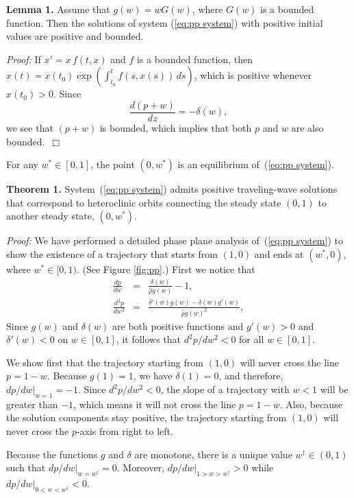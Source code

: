 \documentclass{aims}
\numberwithin{equation}{section}
\begin{document}
\noindent
\textbf{Lemma 1.} Assume that $g(w)=wG(w)$, where $G(w)$ is a bounded function. 
Then the solutions of system (\ref{eq:pp system}) with positive initial values are positive and bounded.

\noindent
\emph{Proof:} If $x'=x\,f(t, x)$ and $f$ is a bounded function, then 
$x(t)=x(t_0)\exp \left(\int^t_{t_0} f(s, x(s))\, ds\right)$, which is positive whenever
$x(t_0)>0$. Since
\begin{equation}
\frac{d(p+w)}{dz}=-\delta(w),
\end{equation}
we see that $(p+w)$ is bounded, which implies that both $p$ and $w$ are also bounded.~$\Box$

For any $w^*\in [0,1]$, the point $(0, w^*)$ is an equilibrium of~(\ref{eq:pp system}).

\noindent
\textbf{Theorem 1.}  System~(\ref{eq:pp system}) admits positive traveling-wave solutions
that correspond to heteroclinic orbits connecting the steady state $(0, 1)$ to another
steady state, $(0, w^*)$.

\indent
\emph{Proof:} We have performed a detailed phase plane analysis of~(\ref{eq:pp system})
to show the existence of a trajectory that starts from $(1,0)$ and ends at $(w^{*},0)$,
where $w^*\in [0,1)$.  (See Figure \ref{fig:pp}.)
First we notice that 
\begin{eqnarray}
\frac{dp}{dw} & = & \frac{\delta(w)}{\hat{\rho}g(w)}-1 , \\
\frac{d^2 p}{dw^{2}} & = & \frac{\delta'(w)g(w)-\delta(w)g'(w)}{\hat{\rho} g(w)^{2}},
\end{eqnarray}
Since $g(w)$ and $\delta(w)$ are both positive functions and
$g'(w)>0$ and $\delta'(w)<0$ on $w\in [0,1]$, it follows that
$d^{2}p/dw^{2}<0$ for all $w\in [0,1]$. 

We show first that the trajectory starting from $(1,0)$ will never cross the line $p=1-w$.
Because $g(1)=1$, we have $\delta(1)=0$, and therefore, $dp/dw\big\vert_{w=1}=-1$.
Since $d^2 p/dw^{2}<0$, the slope of a trajectory with $w<1$ will be greater than
$-1$, which means it will not cross the line $p=1-w$.
Also, because the solution components stay positive, the trajectory starting
from $(1,0)$ will never cross the $p$-axis from right to left. 

Because the functions $g$ and $\delta$ are monotone, 
there is a unique value $w^{\dagger}\in (0, 1)$ such that 
$dp/dw\big\vert_{w=w^{\dagger}}=0$. 
Moreover, $dp/dw\big\vert_{1>w>w^{\dagger}}>0$ while
$dp/dw\big\vert_{0<w<w^{\dagger}}<0$.
\end{document}

